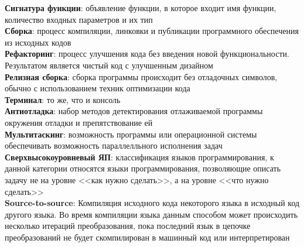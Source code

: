 \textbf{Сигнатура функции}: объявление функции, в которое входит имя функции, количество входных параметров и их тип                          \\
\textbf{Сборка}: процесс компиляции, линковки и публикации программного обеспечения из исходных кодов                              \\
\textbf{Рефакторинг}: процесс улучшения кода без введения новой функциональности. Результатом является чистый код с улучшенным дизайном \\
\textbf{Релизная сборка}: сборка программы происходит без отладочных символов, обычно с использованием техник оптимизации кода              \\
\textbf{Терминал}: то же, что и консоль                                                                                              \\
\textbf{Антиотладка}: набор методов детектирования отлаживаемой программы окружения отладки и препятствование ей                        \\
\textbf{Мультитаскинг}: возможность программы или операционной системы обеспечивать возможность параллелльного исполнения задач           \\
\textbf{Сверхвысокоуровневый ЯП}: классификация языков программирования, к данной категории относятся языки программирования,
позволяющие описать задачу не на уровне <<как нужно сделать>>, а на уровне <<что нужно сделать>>                                                     \\
\textbf{Source-to-source}: Компиляция исходного кода некоторого языка в исходный код другого языка. Во время компиляции языка данным способом
 может происходить несколько итераций преобразования, пока последний язык в цепочке преобразований не будет скомпилирован в машинный код или интерпретирован\\

